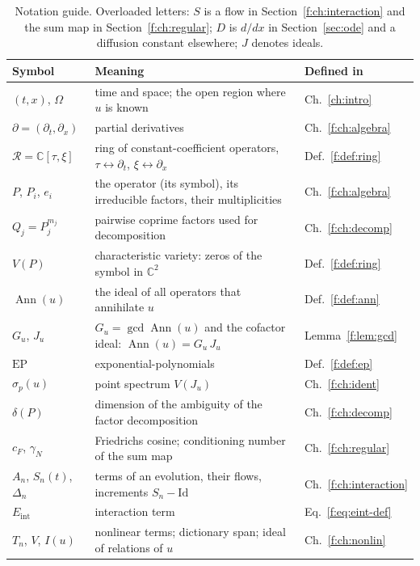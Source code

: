 \documentclass[11pt]{article}
\theoremstyle{plain}
\theoremstyle{definition}
\theoremstyle{remark}
\newcommand{\C}{\mathbb{C}}
\newcommand{\ring}{\mathcal{R}}            %
\DeclareMathOperator{\Ann}{Ann}             %
\newcommand{\Var}{V}                        %
\newcommand{\EP}{\mathrm{EP}}               %
\newcommand{\Id}{\mathrm{Id}}
\newcommand{\Eint}{E_{\mathrm{int}}}        %
\DeclareMathOperator{\Gcd}{gcd}
\begin{document}
\begin{table}[!htb]
\centering\small
\begin{tabular}{@{}L{3.1cm}L{8.9cm}L{2.5cm}@{}}
\toprule
Symbol & Meaning & Defined in\\\midrule
$(t,x)$, $\Omega$ & time and space; the open region where $u$ is known & Ch.~\ref{ch:intro}\\
$\partial=(\partial_t,\partial_x)$ & partial derivatives & Ch.~\ref{f:ch:algebra}\\
$\ring=\C[\tau,\xi]$ & ring of constant-coefficient operators, $\tau\leftrightarrow\partial_t$, $\xi\leftrightarrow\partial_x$ & Def.~\ref{f:def:ring}\\
$P$, $P_i$, $e_i$ & the operator (its symbol), its irreducible factors, their multiplicities & Ch.~\ref{f:ch:algebra}\\
$Q_j=P_j^{m_j}$ & pairwise coprime factors used for decomposition & Ch.~\ref{f:ch:decomp}\\
$\Var(P)$ & characteristic variety: zeros of the symbol in $\C^2$ & Def.~\ref{f:def:ring}\\
$\Ann(u)$ & the ideal of all operators that annihilate $u$ & Def.~\ref{f:def:ann}\\
$G_u$, $J_u$ & $G_u=\Gcd\Ann(u)$ and the cofactor ideal: $\Ann(u)=G_u\,J_u$ & Lemma~\ref{f:lem:gcd}\\
$\EP$ & exponential-polynomials & Def.~\ref{f:def:ep}\\
$\sigma_p(u)$ & point spectrum $\Var(J_u)$ & Ch.~\ref{f:ch:ident}\\
$\delta(P)$ & dimension of the ambiguity of the factor decomposition & Ch.~\ref{f:ch:decomp}\\
$c_F$, $\gamma_N$ & Friedrichs cosine; conditioning number of the sum map & Ch.~\ref{f:ch:regular}\\
$A_n$, $S_n(t)$, $\Delta_n$ & terms of an evolution, their flows, increments $S_n-\Id$ & Ch.~\ref{f:ch:interaction}\\
$\Eint$ & interaction term & Eq.~\eqref{f:eq:eint-def}\\
$T_n$, $V$, $I(u)$ & nonlinear terms; dictionary span; ideal of relations of $u$ & Ch.~\ref{f:ch:nonlin}\\
\bottomrule
\end{tabular}
\caption{Notation guide. Overloaded letters: $S$ is a flow in Section~\ref{f:ch:interaction} and the sum map in Section~\ref{f:ch:regular}; $D$ is $d/dx$ in Section~\ref{sec:ode} and a diffusion constant elsewhere; $J$ denotes ideals.}\label{tab:notation}
\end{table}
\end{document}
